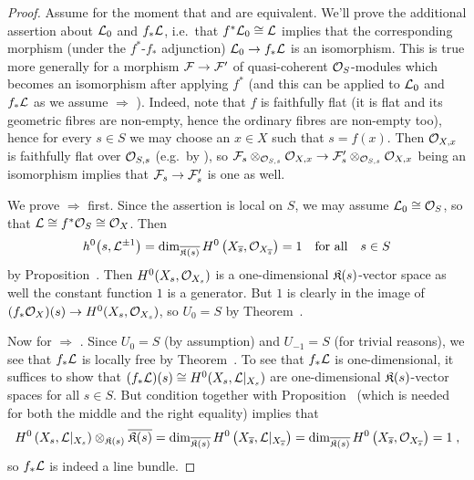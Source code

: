 \documentclass[a4paper,parskip=half,numbers=enddot, DIV=12]{scrreprt}
\begin{document}
\begin{proof}
	Assume for the moment that  and  are equivalent. We'll prove the additional assertion about $\mathcal{L}_0$ and $f_*\mathcal{L}$, i.e.\ that $f^*\mathcal{L}_0\cong \mathcal{L}$ implies that the corresponding morphism (under the $f^*$-$f_*$ adjunction) $\Ll_0\morphism f_*\Ll$ is an isomorphism. This is true more generally for a morphism $\Ff\morphism\Ff'$ of quasi-coherent $\mathcal{O}_S$-modules which becomes an isomorphism after applying $f^*$ (and this can be applied to $\mathcal{L}_0$ and $f_*\mathcal{L}$ as we assume  $\Rightarrow$ ). Indeed, note that $f$ is faithfully flat (it is flat and its geometric fibres are non-empty, hence the ordinary fibres are non-empty too), hence for every $s\in S$ we may choose an $x\in X$ such that $s=f(x)$. Then $\mathcal{O}_{X,x}$ is faithfully flat over $\mathcal{O}_{S,s}$ (e.g.\ by \cite[]{stacks-project}), so $\Ff_s\otimes_{\Oo_{S,s}}\Oo_{X,x}\morphism\Ff'_s\otimes_{\Oo_{S,s}}\Oo_{X,x}$ being an isomorphism implies that $\Ff_s \morphism\Ff'_s$ is one as well.
	
	We prove  $\Rightarrow$  first. Since the assertion is local on $S$, we may assume $\mathcal{L}_0\cong\mathcal{O}_S$, so that $\mathcal{L}\cong f^*\mathcal{O}_S\cong \mathcal{O}_X$. Then
	\begin{align*}
		h^0\big(s,\mathcal{L}^{\pm 1}\big)=\dim_{\overline{\mathfrak{K}(s)}}H^0\left(X_{\overline{s}},\mathcal{O}_{X_{\overline{s}}}\right)=1\quad\text{for all}\quad s\in S 
	\end{align*}
	by Proposition~. Then $H^0(X_s,\mathcal{O}_{X_s})$ is a one-dimensional $\mathfrak{K}(s)$-vector space as well the constant function $1$ is a generator. But $1$ is clearly in the image of $(f_*\Oo_X)(s)\morphism H^0(X_s,\Oo_{X_s})$, so $U_0=S$ by Theorem~.
	
	Now for  $\Rightarrow$ . Since $U_0=S$ (by assumption) and $U_{-1}=S$ (for trivial reasons), we see that $f_*\mathcal{L}$ is locally free by Theorem~. To see that $f_*\mathcal{L}$ is one-dimensional, it suffices to show that $(f_*\mathcal{L})(s)\cong H^0(X_s,\mathcal{L}|_{X_s})$ are one-dimensional $\mathfrak{K}(s)$-vector spaces for all $s\in S$. But condition  together with Proposition~ (which is needed for both the middle and the right equality) implies that 
	\begin{align*}
		H^0\left(X_s,\mathcal{L}|_{X_s}\right)\otimes_{\mathfrak{K}(s)}\overline{\mathfrak{K}(s)}= \dim_{\overline{\mathfrak{K}(s)}}H^0\left(X_{\overline{s}},\mathcal{L}|_{X_{\overline{s}}}\right)=\dim_{\overline{\mathfrak{K}(s)}}H^0\left(X_{\overline{s}},\mathcal{O}_{X_{\overline{s}}}\right)=1\;,
	\end{align*}
	so $f_*\mathcal{L}$ is indeed a line bundle. 
	

\end{proof}
\end{document}
